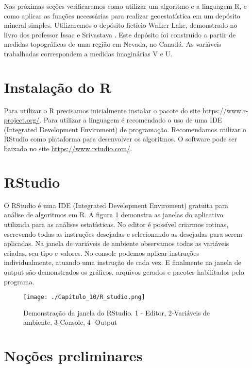 Nas próximas seções verificaremos como utilizar um algoritmo e a linguagem R, e como aplicar as funções necessárias para realizar geoestatística em um depósito mineral simples. Utilizaremos o depósito fictício Walker Lake, demonstrado no livro dos professor Issac e Srivastava \cite{isaaks1989applied}. Este depósito foi construído a partir de medidas topográficas de uma região em Nevada, no Canadá. As variáveis trabalhadas correspondem a medidas imaginárias V e U.

\section{Instalação do R}

Para utilizar o R precisamos inicialmente instalar o pacote do site \url{https://www.r-project.org/}. Para  utilizar a linguagem é recomendado o uso de uma IDE (Integrated Development Enviroment) de programação. Recomendamos utilizar o RStudio como plataforma para desenvolver os algoritmos. O software pode ser baixado no site \url{https://www.rstudio.com/}. 

\section{RStudio} 

O RStudio é uma IDE (Integrated Development Enviroment) gratuita para análise de algoritmos em R. A figura \ref{RStudio} demonstra as janelas do aplicativo utilizada para as análises estatísticas. No editor é possível criarmos rotinas, escrevendo todas as instruções desejadas e selecionando as desejadas para serem aplicadas. Na janela de variáveis de ambiente observamos todas as variáveis criadas, seu tipo e valores. No console podemos aplicar instruções individualmente, atuando uma instrução de cada vez. E finalmente na janela de output são demonstrados os gráficos, arquivos gerados e pacotes habilitados pelo programa. 

\FloatBarrier
\begin{figure}[H]
	\centering
	\texttt{[image: ./Capitulo\_10/R\_studio.png]}	
	\caption{Demonstração da janela do RStudio. 1 - Editor,  2-Variáveis de ambiente, 3-Console, 4- Output}
	\label{RStudio}
\end{figure}
\FloatBarrier


\section{Noções preliminares}

